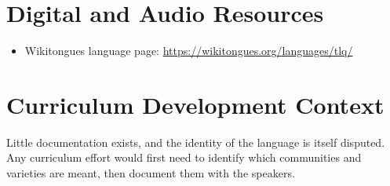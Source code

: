 \documentclass[12pt]{article}
\begin{document}
\section{Digital and Audio Resources}
\begin{itemize}
\item Wikitongues language page: \url{https://wikitongues.org/languages/tlq/}
\end{itemize}

\section{Curriculum Development Context}
Little documentation exists, and the identity of the language is itself disputed. Any curriculum effort would first need to identify which communities and varieties are meant, then document them with the speakers.
\end{document}
